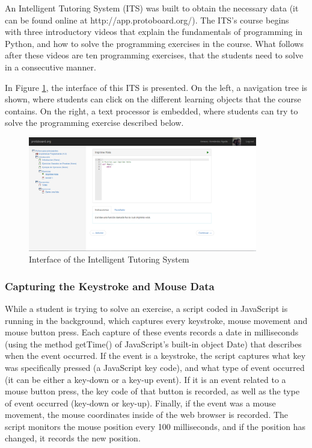 \documentclass[runningheads,a4paper]{llncs}
\begin{document}
An Intelligent Tutoring System (ITS) was built to obtain the necessary data (it can be found online at http://app.protoboard.org/). The ITS's course begins with three introductory videos that explain the fundamentals of programming in Python, and how to solve the programming exercises in the course. What follows after these videos are ten programming exercises, that the students need to solve in a consecutive manner.

In Figure \ref{protoboard}, the interface of this ITS is presented. On the left, a navigation tree is shown, where students can click on the different learning objects that the course contains. On the right, a text processor is embedded, where students can try to solve the programming exercise described below.

\begin{figure}[htp]
  \centerline{\includegraphics[width=10cm]{protoboard.png}}
  \label{protoboard}
  \caption{Interface of the Intelligent Tutoring System}
\end{figure}

\FloatBarrier

\subsubsection{Capturing the Keystroke and Mouse Data}

While a student is trying to solve an exercise, a script coded in JavaScript is running in the background, which captures every keystroke, mouse movement and mouse button press. Each capture of these events records a date in milliseconds (using the method getTime() of JavaScript's built-in object Date) that describes when the event occurred. If the event is a keystroke, the script captures what key was specifically pressed (a JavaScript key code), and what type of event occurred (it can be either a key-down or a key-up event). If it is an event related to a mouse button press, the key code of that button is recorded, as well as the type of event occurred (key-down or key-up). Finally, if the event was a mouse movement, the mouse coordinates inside of the web browser is recorded. The script monitors the mouse position every 100 milliseconds, and if the position has changed, it records the new position.
\end{document}
